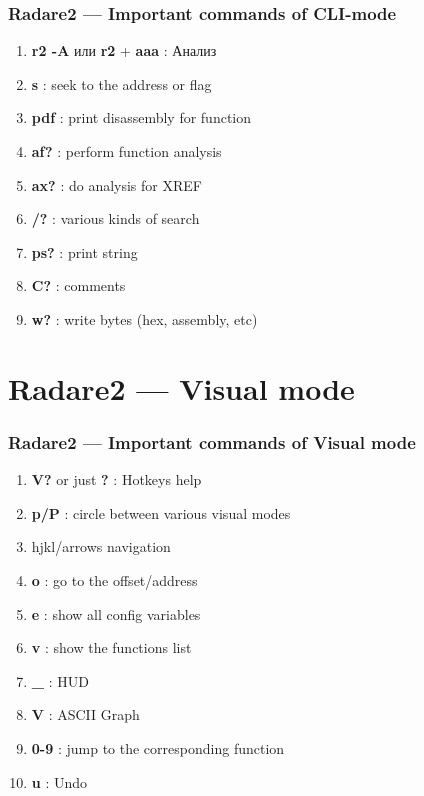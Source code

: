 \documentclass[10pt,pdf,utf8,english,compress,hyperref={unicode}]{beamer}
\begin{document}
\begin{frame}[fragile]
  \frametitle{Radare2 — Important commands of CLI-mode}
  \begin{enumerate}
   \item \alert{\bf{r2 -A}} или \alert{\bf{r2}} + \alert{\bf{aaa}} : Анализ
   \item \alert{\bf{s}} : seek to the address or flag
   \item \alert{\bf{pdf}} : print disassembly for function
   \item \alert{\bf{af?}} : perform function analysis
   \item \alert{\bf{ax?}} : do analysis for XREF
   \item \alert{\bf{/?}} : various kinds of search
   \item \alert{\bf{ps?}} : print string
   \item \alert{\bf{C?}} : comments
   \item \alert{\bf{w?}} : write bytes (hex, assembly, etc)
 \end{enumerate}
\end{frame}

\section{Radare2 — Visual mode}
\begin{frame}[fragile]
  \frametitle{Radare2 — Important commands of Visual mode}
  \begin{enumerate}
  \item \alert{\bf{V?}} or just \alert{\bf{?}} : Hotkeys help
  \item \alert{\bf{p/P}} : circle between various visual modes
  \item hjkl/arrows navigation
  \item \alert{\bf{o}} : go to the offset/address
  \item \alert{\bf{e}} : show all config variables
  \item \alert{\bf{v}} : show the functions list
  \item \alert{\bf{\_}} : HUD
  \item \alert{\bf{V}} : ASCII Graph
  \item \alert{\bf{0-9}} : jump to the corresponding function
  \item \alert{\bf{u}} : Undo
 \end{enumerate}
\end{frame}
\end{document}
